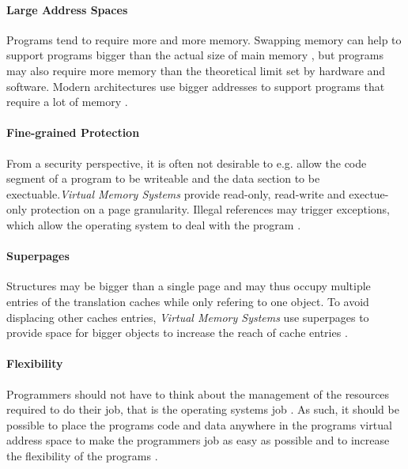 
\paragraph{Large Address Spaces} Programs tend to require more and more memory. Swapping memory can help
to support programs bigger than the actual size of main memory \cite{tanenbaumOS}, but programs may
also require more memory than the theoretical limit set by hardware and software. Modern architectures
use bigger addresses to support programs that require a lot of memory
\cite{jacobSoftwaremanagedAddressTranslation1997, jacobVirtualMemoryContemporary1998}.


\paragraph{Fine-grained Protection} From a security perspective, it is often not desirable to e.g. allow the code segment
of a program to be writeable and the data section to be exectuable.\textit{Virtual Memory Systems} provide read-only,
read-write and exectue-only protection on a page granularity\cite{jacobSoftwaremanagedAddressTranslation1997}.
Illegal references may trigger exceptions, which allow the operating system to deal with the program \cite{jacobVirtualMemoryContemporary1998}.


\paragraph{Superpages}
Structures may be bigger than a single page and may thus occupy multiple entries of the translation caches while
only refering to one object. To avoid displacing other caches entries, \textit{Virtual Memory Systems} use
superpages to provide space for bigger objects to increase the reach of cache entries \cite{jacobSoftwaremanagedAddressTranslation1997}.


\paragraph{Flexibility} Programmers should not have to think about the management
of the resources required to do their job, that is the operating systems job
\cite{tanenbaumOS}. As such, it should be possible to place the programs code
and data anywhere in the programs virtual address space to make the programmers
job as easy as possible and to increase the flexibility of the programs
\cite{jacob1998virtualissues}. %

